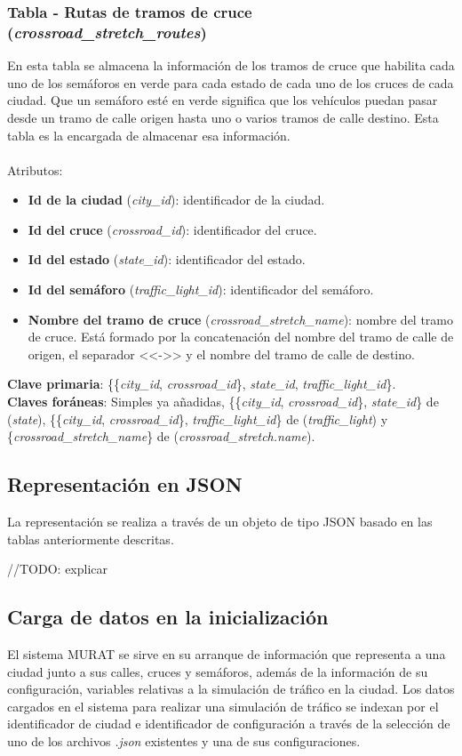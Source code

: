 \subsubsection{Tabla - Rutas de tramos de cruce (\textit{crossroad\_stretch\_routes})}
En esta tabla se almacena la información de los tramos de cruce que habilita cada uno de los semáforos en verde para cada estado de cada uno de los cruces de cada ciudad. Que un semáforo esté en verde significa que los vehículos puedan pasar desde un tramo de calle origen hasta uno o varios tramos de calle destino. Esta tabla es la encargada de almacenar esa información. \\\\
Atributos:
\begin{itemize}
    \item \textbf{Id de la ciudad} (\textit{city\_id}): identificador de la ciudad.
    \item \textbf{Id del cruce} (\textit{crossroad\_id}): identificador del cruce.
    \item \textbf{Id del estado} (\textit{state\_id}): identificador del estado.
    \item \textbf{Id del semáforo} (\textit{traffic\_light\_id}): identificador del semáforo.
    \item \textbf{Nombre del tramo de cruce} (\textit{crossroad\_stretch\_name}): nombre del tramo de cruce. Está formado por la concatenación del nombre del tramo de calle de origen, el separador <<->> y el nombre del tramo de calle de destino.
\end{itemize}
\textbf{Clave primaria}: \{\{\textit{city\_id}, \textit{crossroad\_id}\}, \textit{state\_id}, \textit{traffic\_light\_id}\}. \\
\textbf{Claves foráneas}: Simples ya añadidas, \{\{\textit{city\_id}, \textit{crossroad\_id}\}, \textit{state\_id}\} de (\textit{state}), \{\{\textit{city\_id}, \textit{crossroad\_id}\}, \textit{traffic\_light\_id}\} de (\textit{traffic\_light}) y \newline \{\textit{crossroad\_stretch\_name}\} de (\textit{crossroad\_stretch.name}).

\subsection{Representación en JSON}
La representación se realiza a través de un objeto de tipo JSON basado en las tablas anteriormente descritas.

//TODO: explicar


\subsection{Carga de datos en la inicialización}
El sistema MURAT se sirve en su arranque de información que representa a una ciudad junto a sus calles, cruces y semáforos, además de la información de su configuración, variables relativas a la simulación de tráfico en la ciudad. Los datos cargados en el sistema para realizar una simulación de tráfico se indexan por el identificador de ciudad e identificador de configuración a través de la selección de uno de los archivos \textit{.json} existentes y una de sus configuraciones.